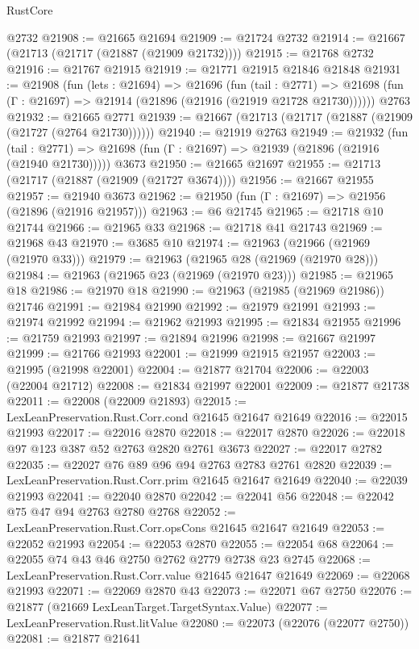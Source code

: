 \begin{lexlean}{RustCore}
\begin{coremodule}
    @2732
@21908 := @21665 @21694
@21909 := @21724 @2732
@21914 := @21667 (@21713 (@21717 (@21887 (@21909 @21732))))
@21915 := @21768 @2732
@21916 := @21767 @21915
@21919 := @21771 @21915 @21846 @21848
@21931 := @21908
    (fun (lets : @21694) =>
    @21696
      (fun (tail : @2771) =>
      @21698 (fun (Γ : @21697) => @21914 (@21896 (@21916 (@21919 @21728 @21730))))))
    @2763
@21932 := @21665 @2771
@21939 := @21667 (@21713 (@21717 (@21887 (@21909 (@21727 (@2764 @21730))))))
@21940 := @21919 @2763
@21949 := @21932
    (fun (tail : @2771) => @21698 (fun (Γ : @21697) => @21939 (@21896 (@21916 (@21940 @21730)))))
    @3673
@21950 := @21665 @21697
@21955 := @21713 (@21717 (@21887 (@21909 (@21727 @3674))))
@21956 := @21667 @21955
@21957 := @21940 @3673
@21962 := @21950 (fun (Γ : @21697) => @21956 (@21896 (@21916 @21957)))
@21963 := @6 @21745
@21965 := @21718 @10 @21744
@21966 := @21965 @33
@21968 := @21718 @41 @21743
@21969 := @21968 @43
@21970 := @3685 @10
@21974 := @21963 (@21966 (@21969 (@21970 @33)))
@21979 := @21963 (@21965 @28 (@21969 (@21970 @28)))
@21984 := @21963 (@21965 @23 (@21969 (@21970 @23)))
@21985 := @21965 @18
@21986 := @21970 @18
@21990 := @21963 (@21985 (@21969 @21986)) @21746
@21991 := @21984 @21990
@21992 := @21979 @21991
@21993 := @21974 @21992
@21994 := @21962 @21993
@21995 := @21834 @21955
@21996 := @21759 @21993
@21997 := @21894 @21996
@21998 := @21667 @21997
@21999 := @21766 @21993
@22001 := @21999 @21915 @21957
@22003 := @21995 (@21998 @22001)
@22004 := @21877 @21704
@22006 := @22003 (@22004 @21712)
@22008 := @21834 @21997 @22001
@22009 := @21877 @21738
@22011 := @22008 (@22009 @21893)
@22015 := LexLeanPreservation.Rust.Corr.cond @21645 @21647 @21649
@22016 := @22015 @21993
@22017 := @22016 @2870
@22018 := @22017 @2870
@22026 := @22018 @97 @123 @387 @52 @2763 @2820 @2761 @3673
@22027 := @22017 @2782
@22035 := @22027 @76 @89 @96 @94 @2763 @2783 @2761 @2820
@22039 := LexLeanPreservation.Rust.Corr.prim @21645 @21647 @21649
@22040 := @22039 @21993
@22041 := @22040 @2870
@22042 := @22041 @56
@22048 := @22042 @75 @47 @94 @2763 @2780 @2768
@22052 := LexLeanPreservation.Rust.Corr.opsCons @21645 @21647 @21649
@22053 := @22052 @21993
@22054 := @22053 @2870
@22055 := @22054 @68
@22064 := @22055 @74 @43 @46 @2750 @2762 @2779 @2738 @23 @2745
@22068 := LexLeanPreservation.Rust.Corr.value @21645 @21647 @21649
@22069 := @22068 @21993
@22071 := @22069 @2870 @43
@22073 := @22071 @67 @2750
@22076 := @21877 (@21669 LexLeanTarget.TargetSyntax.Value)
@22077 := LexLeanPreservation.Rust.litValue
@22080 := @22073 (@22076 (@22077 @2750))
@22081 := @21877 @21641

\end{coremodule}
\end{lexlean}
